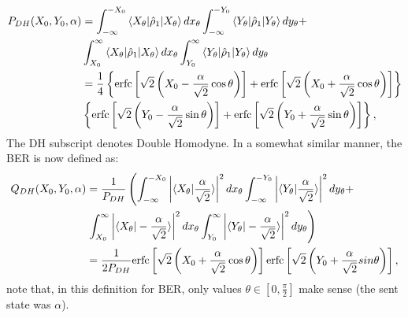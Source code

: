 \documentclass[a4paper]{article}
\begin{document}
\begin{equation}
\begin{aligned}
P_{DH}(X_0,Y_0,\alpha)&=\int^{-X_0}_{-\infty}\braket{X_\theta|\hat{\rho}_1|X_\theta}dx_\theta\int^{-Y_0}_{-\infty}\braket{Y_\theta|\hat{\rho}_1|Y_\theta}dy_\theta+\\
&\int_{X_0}^{\infty}\braket{X_\theta|\hat{\rho}_1|X_\theta}dx_\theta\int_{Y_0}^{\infty}\braket{Y_\theta|\hat{\rho}_1|Y_\theta}dy_\theta\\
&=\frac{1}{4}\left\lbrace\text{erfc}\left[\sqrt{2}\left(X_0-\frac{\alpha}{\sqrt{2}}\cos\theta\right)\right]+\text{erfc}\left[\sqrt{2}\left(X_0+\frac{\alpha}{\sqrt{2}}\cos\theta\right)\right]\right\rbrace\\
&\left\lbrace\text{erfc}\left[\sqrt{2}\left(Y_0-\frac{\alpha}{\sqrt{2}}\sin\theta\right)\right]+\text{erfc}\left[\sqrt{2}\left(Y_0+\frac{\alpha}{\sqrt{2}}\sin\theta\right)\right]\right\rbrace,
\end{aligned}
\end{equation}
The DH subscript denotes Double Homodyne. In a somewhat similar manner, the BER is now defined as:
\begin{equation}\label{eq:adaptedBER}
\begin{aligned}
Q_{DH}(X_0,Y_0,\alpha)&=\frac{1}{P_{DH}}\left(\int^{-X_0}_{-\infty}\left|\braket{X_\theta|\frac{\alpha}{\sqrt{2}}}\right|^2dx_\theta\int^{-Y_0}_{-\infty}\left|\braket{Y_\theta|\frac{\alpha}{\sqrt{2}}}\right|^2dy_\theta+\right.\\
&\left.\int_{X_0}^{\infty}\left|\braket{X_\theta|-\frac{\alpha}{\sqrt{2}}}\right|^2dx_\theta\int_{Y_0}^{\infty}\left|\braket{Y_\theta|-\frac{\alpha}{\sqrt{2}}}\right|^2dy_\theta\right)\\
&=\frac{1}{2P_{DH}}\text{erfc}\left[\sqrt{2}\left(X_0+\frac{\alpha}{\sqrt{2}}\cos\theta\right)\right]\text{erfc}\left[\sqrt{2}\left(Y_0+\frac{\alpha}{\sqrt{2}}sin\theta\right)\right],
\end{aligned}
\end{equation}
note that, in this definition for BER, only values $\theta\in\left[0,\frac{\pi}{2}\right]$ make sense (the sent state was $\alpha$).
\end{document}
